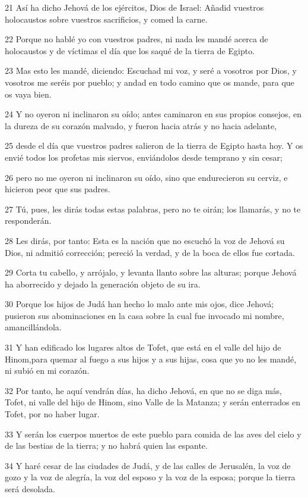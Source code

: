 \par 21 Así ha dicho Jehová de los ejércitos, Dios de Israel: Añadid vuestros holocaustos sobre vuestros sacrificios, y comed la carne.
\par 22 Porque no hablé yo con vuestros padres, ni nada les mandé acerca de holocaustos y de víctimas el día que los saqué de la tierra de Egipto.
\par 23 Mas esto les mandé, diciendo: Escuchad mi voz, y seré a vosotros por Dios, y vosotros me seréis por pueblo; y andad en todo camino que os mande, para que os vaya bien.
\par 24 Y no oyeron ni inclinaron su oído; antes caminaron en sus propios consejos, en la dureza de su corazón malvado, y fueron hacia atrás y no hacia adelante,
\par 25 desde el día que vuestros padres salieron de la tierra de Egipto hasta hoy. Y os envié todos los profetas mis siervos, enviándolos desde temprano y sin cesar;
\par 26 pero no me oyeron ni inclinaron su oído, sino que endurecieron su cerviz, e hicieron peor que sus padres.
\par 27 Tú, pues, les dirás todas estas palabras, pero no te oirán; los llamarás, y no te responderán.
\par 28 Les dirás, por tanto: Esta es la nación que no escuchó la voz de Jehová su Dios, ni admitió corrección; pereció la verdad, y de la boca de ellos fue cortada.
\par 29 Corta tu cabello, y arrójalo, y levanta llanto sobre las alturas; porque Jehová ha aborrecido y dejado la generación objeto de su ira.
\par 30 Porque los hijos de Judá han hecho lo malo ante mis ojos, dice Jehová; pusieron sus abominaciones en la casa sobre la cual fue invocado mi nombre, amancillándola.
\par 31 Y han edificado los lugares altos de Tofet, que está en el valle del hijo de Hinom,para quemar al fuego a sus hijos y a sus hijas, cosa que yo no les mandé, ni subió en mi corazón.
\par 32 Por tanto, he aquí vendrán días, ha dicho Jehová, en que no se diga más, Tofet, ni valle del hijo de Hinom, sino Valle de la Matanza; y serán enterrados en Tofet, por no haber lugar.
\par 33 Y serán los cuerpos muertos de este pueblo para comida de las aves del cielo y de las bestias de la tierra; y no habrá quien las espante.
\par 34 Y haré cesar de las ciudades de Judá, y de las calles de Jerusalén, la voz de gozo y la voz de alegría, la voz del esposo y la voz de la esposa; porque la tierra será desolada.

